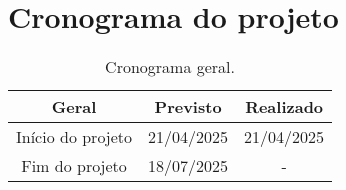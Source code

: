 \chapter{Cronograma do projeto}

\begin{table}[htpb]
\begin{center}
\caption{Cronograma geral.}
\begin{tabular}{|c|c|c|}
\hline
\textbf{Geral}          & \textbf{Previsto} & \textbf{Realizado} \\ \hline
Início do projeto       & 21/04/2025        & 21/04/2025         \\ \hline
Fim do projeto          & 18/07/2025        & -         \\ \hline
\end{tabular}
\end{center}
\end{table}

